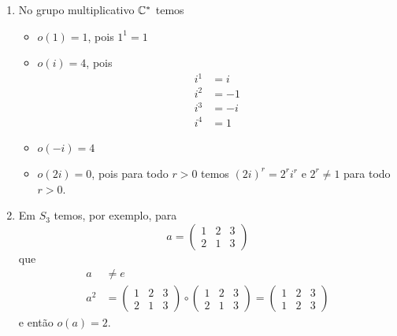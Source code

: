 \begin{exemplos}
    \begin{enumerate}[label={\arabic*})]
        \item No grupo multiplicativo $\mathbb{C}^*$ temos
        \begin{itemize}
            \item $o(1) = 1$,  pois $1^1 = 1$

            \item $o(i) = 4$, pois
            \begin{align*}
                i^1 &= i\\
                i^2 &= -1\\
                i^3 &= -i\\
                i^4 &= 1
            \end{align*}

            \item $o(-i) = 4$

            \item $o(2i) = 0$, pois para todo $r > 0$ temos $(2i)^r = 2^ri^r$ e $2^r \ne 1$ para todo $r > 0$.

        \end{itemize}

        \item Em $S_3$ temos, por exemplo, para
        \[
            a = \begin{pmatrix}
                1 & 2 & 3\\
                2 & 1 & 3
            \end{pmatrix}
        \]
        que
        \begin{align*}
            a &\ne e\\
            a^2 &=  \begin{pmatrix}
                1 & 2 & 3\\
                2 & 1 & 3
            \end{pmatrix} \circ \begin{pmatrix}
                1 & 2 & 3\\
                2 & 1 & 3
            \end{pmatrix} = \begin{pmatrix}
                1 & 2 & 3\\
                1 & 2 & 3
            \end{pmatrix}
        \end{align*}
        e então $o(a) = 2$.


\end{enumerate}
\end{exemplos}
